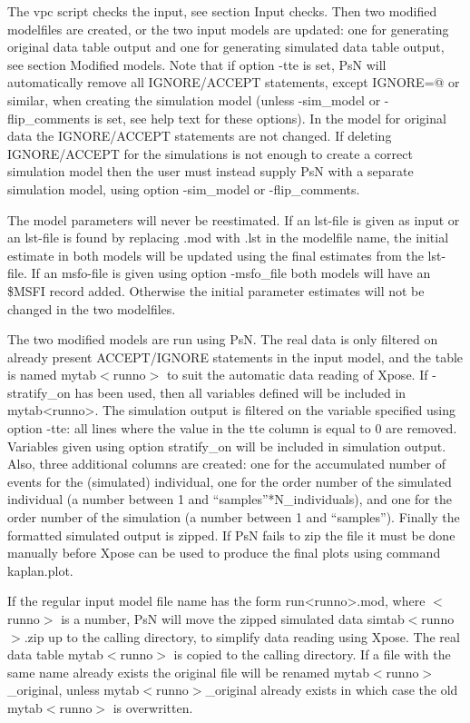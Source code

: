 The vpc script checks the input, see section Input checks. Then two modified modelfiles are created, or the two input models are updated: one for generating original data table output and one for generating simulated data table output, see section Modified models. Note that if option -tte is set, PsN will automatically remove all  IGNORE/ACCEPT statements, except IGNORE=@ or similar,  when creating the simulation model (unless -sim\_model or -flip\_comments is set, see help text for these options). In the model for original data the IGNORE/ACCEPT statements are not changed. If deleting IGNORE/ACCEPT for the simulations is not enough to create a correct simulation model then the user must instead supply PsN with a separate simulation model, using option -sim\_model or -flip\_comments.

The model parameters will never be reestimated. If an lst-file is given as input or an lst-file is found by replacing .mod with .lst in the modelfile name, the initial estimate in both models will be updated using the final estimates from the lst-file. If an msfo-file is given using option -msfo\_file both models will have an \$MSFI record added. Otherwise the initial parameter estimates will not be changed in the two modelfiles. 

The two modified models are run using PsN. The real data is only filtered on already present ACCEPT/IGNORE statements in the input model, and the table is named mytab$<$runno$>$ to suit the automatic data reading of Xpose. If -stratify\_on has been used, then all variables defined will be included in mytab<runno>. The simulation output is filtered on the variable specified using option -tte: all lines where the value in the tte column is equal to 0 are removed. Variables given using option stratify\_on will be included in simulation output. Also, three additional columns are created: one for the accumulated number of events for the (simulated) individual, one for the order number of the simulated individual (a number between 1 and “samples”*N\_individuals), and one for the order number of the simulation (a number between 1 and “samples”).  Finally the formatted simulated output is zipped. If PsN fails to zip the file it must be done manually before Xpose can be used to produce the final plots using command kaplan.plot.

If the regular input model file name has the form run<runno>.mod, where $<$runno$>$ is a number, PsN will move the zipped simulated data simtab$<$runno$>$.zip up to the calling directory, to simplify data reading using Xpose. The real data table mytab$<$runno$>$ is copied to the calling directory. If a file with the same name already exists the original file will be renamed mytab$<$runno$>$\_original, unless mytab$<$runno$>$\_original already exists in which case the old mytab$<$runno$>$ is overwritten. 

